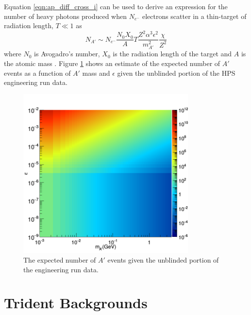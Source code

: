 Equation \ref{eqn:ap_diff_cross_i} can be used to derive an expression for the
number of heavy photons produced when $N_{e^-}$ electrons scatter in a
thin-target of radiation length, $T \ll 1$ as  
\begin{equation}
        N_{A'} \sim N_{e^-}\frac{N_0X_0}{A}T\frac{Z^2\alpha^3\epsilon^2}{m_{A'}^2}\frac{\chi}{Z^2}
\end{equation}
where $N_0$ is Avogadro's number, $X_0$ is the radiation length of the target
and $A$ is the atomic mass \cite{Bjorken:2009mm}.  Figure \ref{fig:ap_rate} shows
an estimate of the expected number of $A'$ events as a function of $A'$ mass 
and $\epsilon$ given the unblinded portion of the HPS engineering run data.
\begin{figure}[t]
    \centering
    \includegraphics[width=0.8\textwidth]{images/20160517_rate.png}
    \caption{The expected number of $A'$ events given the unblinded portion of
             the engineering run data.}
    \label{fig:ap_rate}
\end{figure}  

\section{Trident Backgrounds} \label{sec:tri_bkgs}

